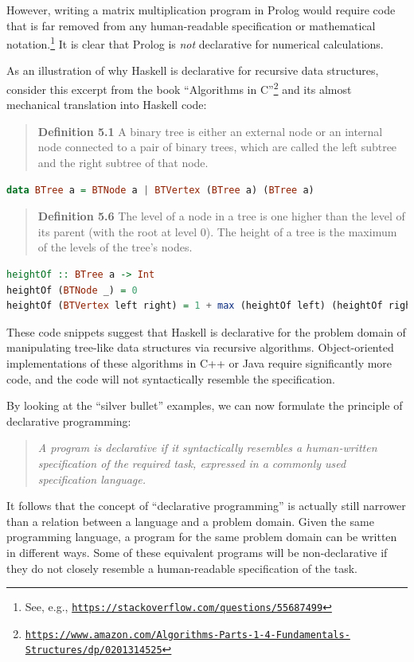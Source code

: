 However, writing a matrix multiplication program in Prolog would require
code that is far removed from any human-readable specification or
mathematical notation.\footnote{See, e.g., \texttt{\href{https://stackoverflow.com/questions/55687499}{https://stackoverflow.com/questions/55687499}}}
It is clear that Prolog is \emph{not} declarative for numerical calculations.

As an illustration of why Haskell is declarative for recursive data
structures, consider this excerpt from the book \textsf{``}Algorithms in C\textsf{''}\footnote{\texttt{\href{https://www.amazon.com/Algorithms-Parts-1-4-Fundamentals-Structures/dp/0201314525}{https://www.amazon.com/Algorithms-Parts-1-4-Fundamentals-Structures/dp/0201314525}}}
and its almost mechanical translation into Haskell code:
\begin{quotation}
\textbf{Definition 5.1} A binary tree is either an external node or
an internal node connected to a pair of binary trees, which are called
the left subtree and the right subtree of that node.
\end{quotation}
\begin{lstlisting}[language=Haskell]
data BTree a = BTNode a | BTVertex (BTree a) (BTree a)
\end{lstlisting}

\begin{quotation}
\textbf{Definition 5.6} The level of a node in a tree is one higher
than the level of its parent (with the root at level 0). The height
of a tree is the maximum of the levels of the tree\textsf{'}s nodes.
\end{quotation}
\begin{lstlisting}[language=Haskell]
heightOf :: BTree a -> Int
heightOf (BTNode _) = 0
heightOf (BTVertex left right) = 1 + max (heightOf left) (heightOf right)
\end{lstlisting}

These code snippets suggest that Haskell is declarative for the problem
domain of manipulating tree-like data structures via recursive algorithms.
Object-oriented implementations of these algorithms in C++ or Java
require significantly more code, and the code will not syntactically
resemble the specification. 

By looking at the \textsf{``}silver bullet\textsf{''} examples, we can now formulate
the principle of declarative programming:
\begin{quote}
\emph{A program is declarative if it syntactically resembles a human-written
specification of the required task, expressed in a commonly used specification
language. }
\end{quote}
It follows that the concept of \textsf{``}declarative programming\textsf{''} is actually
still narrower than a relation between a language and a problem domain.
Given the same programming language, a program for the same problem
domain can be written in different ways. Some of these equivalent
programs will be non-declarative if they do not closely resemble a
human-readable specification of the task.

